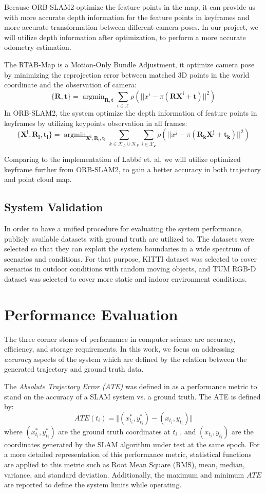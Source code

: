 \documentclass[12pt]{article}
\DeclareMathOperator*{\argmin}{argmin}
\begin{document}
Because ORB-SLAM2 optimize the feature points in the map, it can provide us with more accurate depth information for the feature points\cite{mur2017orb} in keyframes and more accurate transformation between different camera poses. In our project, we will utilize depth information after optimization, to perform a more accurate odometry estimation.

The RTAB-Map is a Motion-Only Bundle Adjustment, it optimize camera pose by minimizing the reprojection error between matched 3D points in the world coordinate and the observation of camera:
$$
\{\mathbf{R,t}\}= \argmin_{\mathbf{R,t}}\sum_{i\in\mathcal{X}}\rho(||x^i-\pi(\mathbf{RX^i+t})||^2) 
$$ 
In ORB-SLAM2, the system optimize the depth information of feature points in keyframes by utilizing keypoints observation in all frames\cite{mur2017orb}:
$$
\{\mathbf{X^i,R_l,t_l}\}= \argmin_{\mathbf{X^i,R_l,t_l}}\sum_{k\in\mathcal{K}_L\cup\mathcal{K}_F} \sum_{i\in\mathcal{X_k}}\rho(||x^j-\pi(\mathbf{R_kX^j+t_k})||^2) 
$$ 

Comparing to the implementation of Labb{\'e} et. al\cite{labbe2019rtab}, we will utilize optimized keyframe further from ORB-SLAM2, to gain a better accuracy in both trajectory and point cloud map. 

\subsection{System Validation}
In order to have a unified procedure for evaluating the system performance, publicly available datasets with ground truth are utilized to. The datasets were selected so that they can exploit the system boundaries in a wide spectrum of scenarios and conditions. For that purpose, KITTI dataset \cite{Geiger2012CVPR} was selected to cover scenarios in outdoor conditions with random moving objects, and TUM RGB-D dataset \cite{sturm2012benchmark} was selected to cover more static and indoor environment conditions.

\section{Performance Evaluation}
The three corner stones of performance in computer science are accuracy, efficiency, and storage requirements. In this work, we focus on addressing \textit{accuracy} aspects of the system which are defined by the relation between the generated trajectory and ground truth data. 

The \textit{Absolute Trajectory Error (ATE)} was defined in \cite{8710464} as a performance metric to stand on the accuracy of a SLAM system vs. a ground truth. The ATE is defined by:
\begin{equation}
ATE(t_i) = \Vert (x_{t_i}^*,y_{t_i}^*) - (x_{t_i},y_{t_i}) \Vert
\end{equation}
where $(x_{t_i}^*,y_{t_i}^*)$ are the ground truth coordinates at $t_i$ , and $(x_{t_i},y_{t_i})$ are the coordinates generated by the SLAM algorithm under test at the same epoch. For a more detailed representation of this performance metric, statistical functions are applied to this metric such as Root Mean Square (RMS), mean, median, variance, and standard deviation. Additionally, the maximum and minimum $ATE$ are reported to define the system limits while operating. 
\end{document}
